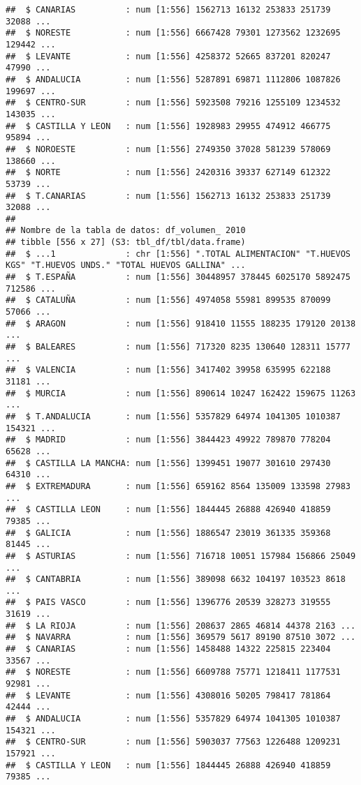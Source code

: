 \documentclass[
]{article}
\begin{document}
\begin{verbatim}
##  $ CANARIAS          : num [1:556] 1562713 16132 253833 251739 32088 ...
##  $ NORESTE           : num [1:556] 6667428 79301 1273562 1232695 129442 ...
##  $ LEVANTE           : num [1:556] 4258372 52665 837201 820247 47990 ...
##  $ ANDALUCIA         : num [1:556] 5287891 69871 1112806 1087826 199697 ...
##  $ CENTRO-SUR        : num [1:556] 5923508 79216 1255109 1234532 143035 ...
##  $ CASTILLA Y LEON   : num [1:556] 1928983 29955 474912 466775 95894 ...
##  $ NOROESTE          : num [1:556] 2749350 37028 581239 578069 138660 ...
##  $ NORTE             : num [1:556] 2420316 39337 627149 612322 53739 ...
##  $ T.CANARIAS        : num [1:556] 1562713 16132 253833 251739 32088 ...
##  
## Nombre de la tabla de datos: df_volumen_ 2010 
## tibble [556 x 27] (S3: tbl_df/tbl/data.frame)
##  $ ...1              : chr [1:556] ".TOTAL ALIMENTACION" "T.HUEVOS KGS" "T.HUEVOS UNDS." "TOTAL HUEVOS GALLINA" ...
##  $ T.ESPAÑA          : num [1:556] 30448957 378445 6025170 5892475 712586 ...
##  $ CATALUÑA          : num [1:556] 4974058 55981 899535 870099 57066 ...
##  $ ARAGON            : num [1:556] 918410 11555 188235 179120 20138 ...
##  $ BALEARES          : num [1:556] 717320 8235 130640 128311 15777 ...
##  $ VALENCIA          : num [1:556] 3417402 39958 635995 622188 31181 ...
##  $ MURCIA            : num [1:556] 890614 10247 162422 159675 11263 ...
##  $ T.ANDALUCIA       : num [1:556] 5357829 64974 1041305 1010387 154321 ...
##  $ MADRID            : num [1:556] 3844423 49922 789870 778204 65628 ...
##  $ CASTILLA LA MANCHA: num [1:556] 1399451 19077 301610 297430 64310 ...
##  $ EXTREMADURA       : num [1:556] 659162 8564 135009 133598 27983 ...
##  $ CASTILLA LEON     : num [1:556] 1844445 26888 426940 418859 79385 ...
##  $ GALICIA           : num [1:556] 1886547 23019 361335 359368 81445 ...
##  $ ASTURIAS          : num [1:556] 716718 10051 157984 156866 25049 ...
##  $ CANTABRIA         : num [1:556] 389098 6632 104197 103523 8618 ...
##  $ PAIS VASCO        : num [1:556] 1396776 20539 328273 319555 31619 ...
##  $ LA RIOJA          : num [1:556] 208637 2865 46814 44378 2163 ...
##  $ NAVARRA           : num [1:556] 369579 5617 89190 87510 3072 ...
##  $ CANARIAS          : num [1:556] 1458488 14322 225815 223404 33567 ...
##  $ NORESTE           : num [1:556] 6609788 75771 1218411 1177531 92981 ...
##  $ LEVANTE           : num [1:556] 4308016 50205 798417 781864 42444 ...
##  $ ANDALUCIA         : num [1:556] 5357829 64974 1041305 1010387 154321 ...
##  $ CENTRO-SUR        : num [1:556] 5903037 77563 1226488 1209231 157921 ...
##  $ CASTILLA Y LEON   : num [1:556] 1844445 26888 426940 418859 79385 ...

\end{verbatim}
\end{document}
